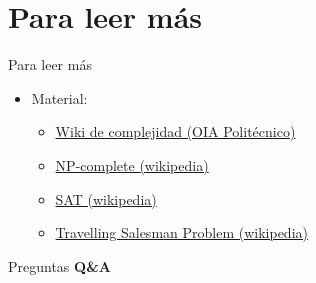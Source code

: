 \documentclass[aspectratio=169]{beamer}
\begin{document}
\section*{Para leer más}

\begin{frame}{Para leer más}
  \begin{itemize}
    \item Material:
      \begin{itemize}
        \item \href{https://oia-politecnico.github.io/wiki/complejidad}{Wiki de complejidad (OIA Politécnico)}
        \item \href{https://en.wikipedia.org/wiki/NP-complete}{NP-complete (wikipedia)}
        \item \href{https://en.wikipedia.org/wiki/Boolean_satisfiability_problem}{SAT (wikipedia)}
        \item \href{https://en.wikipedia.org/wiki/Travelling_salesman_problem}{Travelling Salesman Problem (wikipedia)}
      \end{itemize}
  \end{itemize}
\end{frame}


\begin{frame}{Preguntas}
  \centering
  \Huge
  \textbf{Q\&A}
\end{frame}
\end{document}
